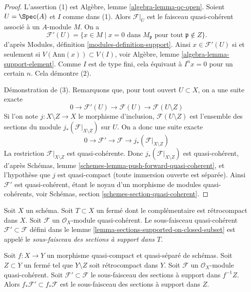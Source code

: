 \begin{proof}
L'assertion (1) est Algèbre, lemme \ref{algebra-lemma-qc-open}.
Soient $U = \Spec(A)$ et $I$ comme dans (1).
Alors $\mathcal{F}|_U$ est le faisceau quasi-cohérent associé
à un $A$-module $M$. On a
$$
\mathcal{F}'(U) = \{x \in M \mid x = 0\text{ dans }M_\mathfrak p
\text{ pour tout }\mathfrak p \not \in Z\}.
$$
d'après Modules, définition \ref{modules-definition-support}. Ainsi
$x \in \mathcal{F}'(U)$ si et seulement si $V(\text{Ann}(x)) \subset V(I)$, voir
Algèbre, lemme \ref{algebra-lemma-support-element}. Comme $I$ est
de type fini, cela équivaut à $I^n x = 0$ pour un certain $n$.
Cela démontre (2).

\medskip\noindent
Démonstration de (3). Remarquons que, pour tout ouvert $U \subset X$, on a une suite exacte
$$
0 \to \mathcal{F}'(U) \to \mathcal{F}(U) \to \mathcal{F}(U \setminus Z)
$$
Si l'on note $j : X \setminus Z \to X$ le morphisme
d'inclusion, $\mathcal{F}(U \setminus Z)$ est l'ensemble des sections
du module $j_*(\mathcal{F}|_{X \setminus Z})$ sur $U$. On a donc
une suite exacte
$$
0 \to \mathcal{F}' \to \mathcal{F} \to j_*(\mathcal{F}|_{X \setminus Z})
$$
La restriction $\mathcal{F}|_{X \setminus Z}$ est quasi-cohérente.
Donc $j_*(\mathcal{F}|_{X \setminus Z})$ est quasi-cohérent,
d'après Schémas, lemme \ref{schemes-lemma-push-forward-quasi-coherent},
et l'hypothèse que $j$ est quasi-compact (toute immersion
ouverte est séparée). Ainsi $\mathcal{F}'$ est quasi-cohérent,
étant le noyau d'un morphisme de modules quasi-cohérents,
voir Schémas, section \ref{schemes-section-quasi-coherent}.
\end{proof}

\begin{definition}
\label{definition-subsheaf-sections-supported-on-closed}
Soit $X$ un schéma.
Soit $T \subset X$ un fermé dont le complémentaire est
rétrocompact dans $X$.
Soit $\mathcal{F}$ un $\mathcal{O}_X$-module
quasi-cohérent. Le sous-faisceau quasi-cohérent $\mathcal{F}' \subset \mathcal{F}$ défini dans
le lemme \ref{lemma-sections-supported-on-closed-subset} est appelé
le {\it sous-faisceau des sections à support dans $T$}.
\end{definition}

\begin{lemma}
\label{lemma-push-sections-supported-on-closed-subset}
Soit $f : X \to Y$ un morphisme quasi-compact et quasi-séparé de
schémas. Soit $Z \subset Y$ un fermé tel que
$Y \setminus Z$ soit rétrocompact dans $Y$. Soit $\mathcal{F}$ un
$\mathcal{O}_X$-module quasi-cohérent. Soit $\mathcal{F}' \subset \mathcal{F}$
le sous-faisceau des sections à support dans $f^{-1}Z$.
Alors $f_*\mathcal{F}' \subset f_*\mathcal{F}$ est le
sous-faisceau des sections à support dans $Z$.
\end{lemma}

